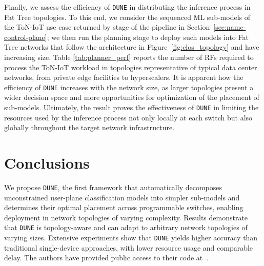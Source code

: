\documentclass[journal]{IEEEtran}
\theoremstyle{plain} %
\newcommand*\numO[1]{\raisebox{.5pt}{\textcircled{\raisebox{-.9pt} {#1}}}}
\newcommand{\name}{\texttt{\fontsize{9}{11}\selectfont DUNE}\xspace}
\begin{document}
Finally, we assess the efficiency of \name in distributing the inference process in Fat Tree topologies. To this end, we consider the sequenced ML sub-models of the ToN-IoT use case returned by stage \numO{5} of the pipeline in Section~\ref{sec:name-control-plane}; we then run the planning stage \numO{6} to deploy such models into Fat Tree networks that follow the architecture in Figure~\ref{fig:clos_topology} and have increasing size.
Table \ref{tab:planner_perf} reports the number of RFs required to process the ToN-IoT workload in topologies representative of typical data center networks, from private edge facilities to hyperscalers.
It is apparent how the efficiency of \name increases with the network size, as larger topologies present a wider decision space and more opportunities for optimization of the placement of sub-models. Ultimately, the result proves the effectiveness of \name in limiting the resources used by the inference process not only locally at each switch but also globally throughout the target network infrastructure.

\section{Conclusions}
\label{sec:conclusions}

We propose \name, the first framework that automatically decomposes unconstrained user-plane classification models into simpler sub-models and determines their optimal placement across programmable switches, enabling deployment in network topologies of varying complexity. Results demonstrate that \name is topology-aware and can adapt to arbitrary network topologies of varying sizes.
Extensive experiments show that \name yields higher accuracy than traditional single-device approaches, with lower resource usage and comparable delay.
The authors have provided public access to their code at~\cite{code-dune}.



\end{document}
